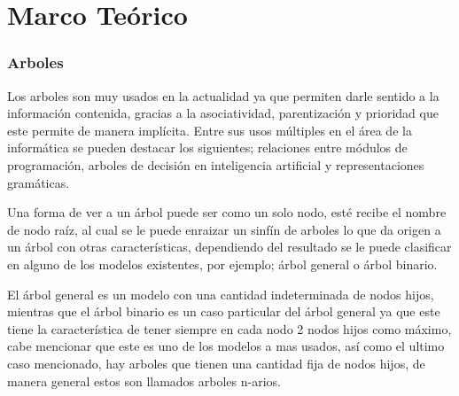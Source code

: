 \chapter{ Marco Teórico  \label{cap2}}
\subsection{Arboles}

Los arboles son muy usados en la actualidad ya que permiten  darle sentido a la
 información contenida, gracias a la asociatividad, parentización y prioridad
 que este permite de manera implícita. Entre sus usos múltiples en el área de
 la informática se pueden destacar los  siguientes; relaciones entre módulos de
 programación, arboles de decisión en inteligencia artificial y representaciones
 gramáticas\cite{gutierrez1999estructuras}.  

Una forma de ver a un árbol puede ser como un solo nodo, esté recibe el nombre
 de  nodo raíz, al cual se le puede enraizar un sinfín de arboles lo que da
 origen  a un árbol con otras características, dependiendo del resultado se le
 puede clasificar en alguno de los modelos existentes, por ejemplo; árbol 
 general o árbol binario\cite{gutierrez1999estructuras}. 

El árbol general es un modelo con una cantidad indeterminada de nodos hijos,
 mientras que el árbol binario es un caso particular del árbol general ya que
 este tiene la característica de tener siempre en cada nodo 2 nodos hijos como
 máximo, cabe mencionar que este es uno de los modelos a mas usados, así como
 el ultimo caso mencionado, hay arboles que tienen una cantidad fija de nodos
 hijos, de manera general estos son llamados arboles n-arios\cite{gutierrez1999estructuras}.